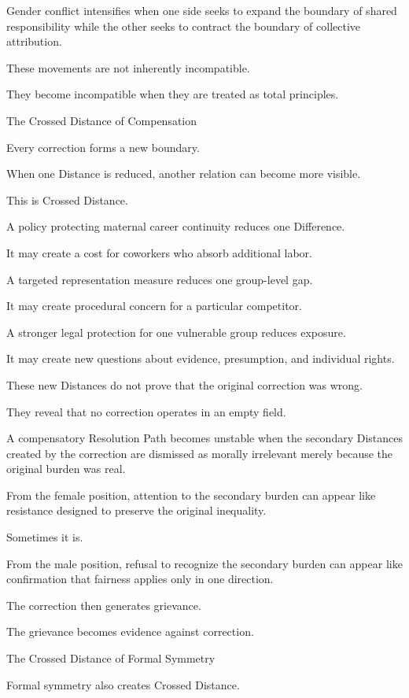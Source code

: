 Gender conflict intensifies when one side seeks to expand the boundary of shared responsibility while the other seeks to contract the boundary of collective attribution.

These movements are not inherently incompatible.

They become incompatible when they are treated as total principles.

The Crossed Distance of Compensation

Every correction forms a new boundary.

When one Distance is reduced, another relation can become more visible.

This is Crossed Distance.

A policy protecting maternal career continuity reduces one Difference.

It may create a cost for coworkers who absorb additional labor.

A targeted representation measure reduces one group-level gap.

It may create procedural concern for a particular competitor.

A stronger legal protection for one vulnerable group reduces exposure.

It may create new questions about evidence, presumption, and individual rights.

These new Distances do not prove that the original correction was wrong.

They reveal that no correction operates in an empty field.

A compensatory Resolution Path becomes unstable when the secondary Distances created by the correction are dismissed as morally irrelevant merely because the original burden was real.

From the female position, attention to the secondary burden can appear like resistance designed to preserve the original inequality.

Sometimes it is.

From the male position, refusal to recognize the secondary burden can appear like confirmation that fairness applies only in one direction.

The correction then generates grievance.

The grievance becomes evidence against correction.

The Crossed Distance of Formal Symmetry

Formal symmetry also creates Crossed Distance.

